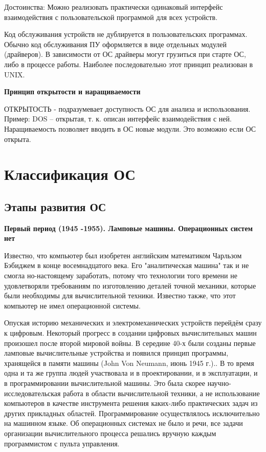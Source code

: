 Достоинства:
Можно реализовать практически одинаковый интерфейс взаимодействия с пользовательской программой для всех устройств.

Код обслуживания устройств не дублируется в пользовательских программах.
Обычно код обслуживания ПУ оформляется в виде отдельных модулей (драйверов). В зависимости от ОС драйверы могут грузиться при старте ОС, либо в процессе работы. Наиболее последовательно этот принцип реализован в UNIX.
\newline

\textbf{Принцип открытости и наращиваемости}

ОТКРЫТОСТЬ - подразумевает доступность ОС для анализа и использования.
Пример: DOS – открытая, т. к. описан интерфейс взаимодействия с ней.
Наращиваемость позволяет вводить в ОС новые модули. Это возможно если ОС открыта.

\newpage

\section{Классификация ОС}
\subsection{Этапы развития ОС}

\textbf{Первый период (1945 -1955). Ламповые машины. Операционных систем нет}

Известно, что компьютер был изобретен английским математиком Чарльзом Бэбиджем в конце восемнадцатого века. Его "аналитическая машина" так и не смогла но-настоящему заработать, потому что технологии того времени не удовлетворяли требованиям по изготовлению деталей точной механики, которые были необходимы для вычислительной техники. Известно также, что этот компьютер не имел операционной системы.

Опуская историю механических и электромеханических устройств перейдём сразу к цифровым. Некоторый прогресс в создании цифровых вычислительных машин произошел после второй мировой войны. В середине 40-х были созданы первые ламповые вычислительные устройства и появился принцип программы, хранящейся в памяти машины (John Von Neumann, июнь 1945 г.).. В то время одна и та же группа людей участвовала и в проектировании, и в эксплуатации, и в программировании вычислительной машины. Это была скорее научно-исследовательская работа в области вычислительной техники, а не использование компьютеров в качестве инструмента решения каких-либо практических задач из других прикладных областей. Программирование осуществлялось исключительно на машинном языке. Об операционных системах не было и речи, все задачи организации вычислительного процесса решались вручную каждым программистом с пульта управления.

